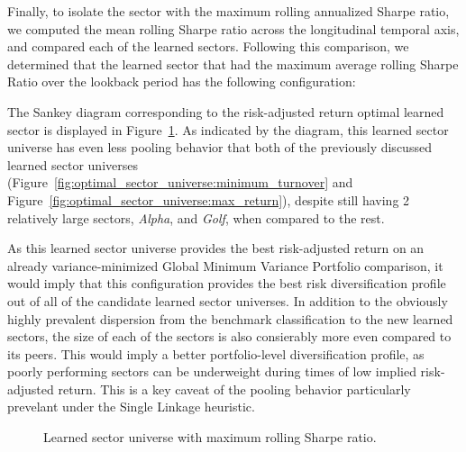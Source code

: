 \documentclass[../main.tex]{subfiles}
\begin{document}
Finally, to isolate the sector with the maximum rolling annualized Sharpe ratio, we computed the mean rolling Sharpe ratio across the longitudinal temporal axis, and compared each of the learned sectors. Following this comparison, we determined that the learned sector that had the maximum average rolling Sharpe Ratio over the lookback period has the following configuration:

\begin{minipage}{\linewidth}
    \centering
    \bfseries
\end{minipage}

\vspace{1em}

The Sankey diagram corresponding to the risk-adjusted return optimal learned sector is displayed in Figure~\ref{fig:optimal_sector_universe:max_sharpe}. As indicated by the diagram, this learned sector universe has even less pooling behavior that both of the previously discussed learned sector universes (Figure~\ref{fig:optimal_sector_universe:minimum_turnover} and Figure~\ref{fig:optimal_sector_universe:max_return}), despite still having 2 relatively large sectors, \textit{Alpha}, and \textit{Golf}, when compared to the rest.

As this learned sector universe provides the best risk-adjusted return on an already variance-minimized Global Minimum Variance Portfolio comparison, it would imply that this configuration provides the best risk diversification profile out of all of the candidate learned sector universes. In addition to the obviously highly prevalent dispersion from the benchmark classification to the new learned sectors, the size of each of the sectors is also consierably more even compared to its peers. This would imply a better portfolio-level diversification profile, as poorly performing sectors can be underweight during times of low implied risk-adjusted return. This is a key caveat of the pooling behavior particularly prevelant under the Single Linkage heuristic.

\begin{figure}[h]
    \centering
    \caption{Learned sector universe with maximum rolling Sharpe ratio.}
    \label{fig:optimal_sector_universe:max_sharpe}
\end{figure}
\end{document}
